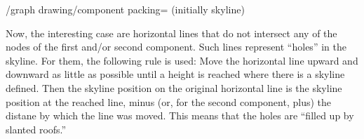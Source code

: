 \begin{key}{/graph drawing/component packing= (initially
    skyline)}
\begin{itemize}
    Now, the interesting case are horizontal lines that do not
    intersect any of the nodes of the first and/or second
    component. Such lines represent ``holes'' in the skyline. For
    them, the following rule is used: Move the horizontal line upward
    and downward as little as possible until a height is reached where
    there is a skyline defined. Then the skyline position on the
    original horizontal line is the skyline position at the reached
    line, minus (or, for the second component, plus) the distane by
    which the line was moved. This means that the holes are ``filled
    up by slanted roofs.''
\begin{codeexample}[]
\end{codeexample}

\end{itemize}
\end{key}




\endinput

